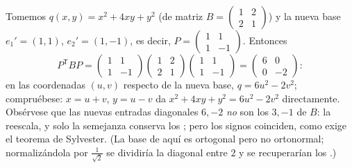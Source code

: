 \begin{example}\label{ex:b2:quadratic:congruence}
Tomemos $q(x, y) = x^2 + 4xy + y^2$ (de matriz $B = \begin{pmatrix}
1 & 2\\ 2 & 1\end{pmatrix}$) y la nueva base $e_1' = (1, 1)$, $e_2'
= (1, -1)$, es decir, $P = \begin{pmatrix} 1 & 1\\ 1 &
-1\end{pmatrix}$. Entonces
\[
P^{\mathsf T}BP
= \begin{pmatrix} 1 & 1\\ 1 & -1\end{pmatrix}
\begin{pmatrix} 1 & 2\\ 2 & 1\end{pmatrix}
\begin{pmatrix} 1 & 1\\ 1 & -1\end{pmatrix}
= \begin{pmatrix} 6 & 0\\ 0 & -2\end{pmatrix} :
\]
en las coordenadas $(u, v)$ respecto de la nueva base, $q = 6u^2 -
2v^2$; compruébese: $x = u + v$, $y = u - v$ da $x^2 + 4xy + y^2 =
6u^2 - 2v^2$ directamente. Obsérvese que las nuevas entradas
diagonales $6, -2$ \emph{no} son los  $3, -1$ de
$B$: la  reescala, y solo la semejanza conserva los
; pero los signos coinciden, como exige el teorema de
Sylvester. (La base de aquí es ortogonal pero no ortonormal;
normalizándola por $\frac{1}{\sqrt2}$ se dividiría la diagonal entre
$2$ y se recuperarían los .)
\end{example}

